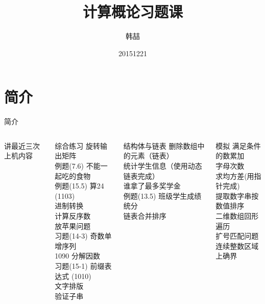 \documentclass[color=usenames,dvipsnames]{beamer}
\title[COE2015上机题]{计算概论习题课}
\author{韩喆}
\institute{WIP@ICST}
\date{20151221}
\begin{document}
\begin{frame}
  \titlepage
\end{frame}


\section{简介}

\begin{frame}{简介}\footnotesize

\begin{columns}
 \column{0.45\hsize}
讲最近三次上机内容
\vspace{0.5cm}

 \begin{block}{综合练习}
旋转输出矩阵 \\ 
例题(7.6) 不能一起吃的食物 \\ 
例题(15.5) 算24 (1103) \\ 
进制转换 \\ 
计算反序数 \\ 
放苹果问题 \\ 
习题(14-3) 奇数单增序列 \\ 
1090 分解因数 \\ 
习题(15-1) 前缀表达式 (1010) \\ 
文字排版 \\ 
验证子串 
 \end{block}
 

 \column{0.45\hsize}
 \begin{block}{结构体与链表}
 删除数组中的元素（链表）\\ 
统计学生信息（使用动态链表完成）\\ 
谁拿了最多奖学金\\ 
例题(13.5) 班级学生成绩统分\\ 
链表合并排序
 \end{block}
 \begin{block}{模拟}
 满足条件的数累加\\ 
字母次数\\ 
求均方差(用指针完成)\\ 
提取数字串按数值排序\\ 
二维数组回形遍历\\ 
扩号匹配问题\\ 
连续整数区域上确界
 \end{block} 
\end{columns}

\end{frame}
\end{document}
